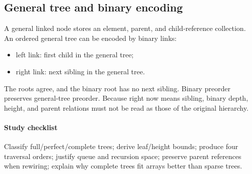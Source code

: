 \documentclass[11pt,letterpaper]{article}
\begin{document}
\subsection{General tree and binary encoding}
A general linked node stores an element, parent, and child-reference collection. An ordered general tree can be encoded by binary links:
\begin{itemize}
\item left link: first child in the general tree;
\item right link: next sibling in the general tree.
\end{itemize}
The roots agree, and the binary root has no next sibling. Binary preorder preserves general-tree preorder. Because right now means sibling, binary depth, height, and parent relations must not be read as those of the original hierarchy.

\paragraph{Study checklist}
Classify full/perfect/complete trees; derive leaf/height bounds; produce four traversal orders; justify queue and recursion space; preserve parent references when rewiring; explain why complete trees fit arrays better than sparse trees.
\end{document}
